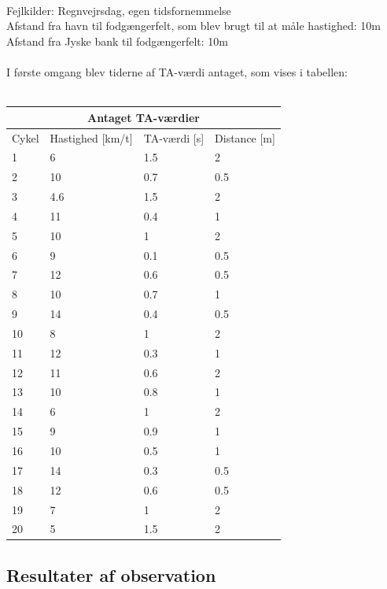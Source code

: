 \\
Fejlkilder: Regnvejrsdag, egen tidsfornemmelse
\\
Afstand fra havn til fodgængerfelt, som blev brugt til at måle hastighed: 10m
\\
Afstand fra Jyske bank til fodgængerfelt: 10m
\\\\
I første omgang blev tiderne af TA-værdi antaget, som vises i tabellen:
\\\\
\begin{tabular}{ |p{1cm}|p{4cm}|p{4cm}|p{4cm}|  }
\hline
\multicolumn{4}{|c|}{Antaget TA-værdier} \\
\hline
Cykel & Hastighed [km/t] & TA-værdi [s] & Distance [m] \\
\hline
1 & 6   & 1.5 & 2 \\
2 & 10  & 0.7 & 0.5 \\
3 & 4.6 & 1.5 & 2 \\
4 & 11  & 0.4 & 1 \\
5 & 10  & 1 & 2 \\
6 & 9   & 0.1 & 0.5 \\
7 & 12  & 0.6 & 0.5 \\
8 & 10  & 0.7 & 1 \\
9 & 14  & 0.4 & 0.5 \\
10 & 8  & 1   & 2 \\
11 & 12 &0.3  &  1 \\
12 & 11 & 0.6 &   2\\
13 & 10 & 0.8 & 1\\
14 & 6  & 1   & 2\\
15 & 9  & 0.9 & 1\\
16 & 10 & 0.5 & 1\\
17 & 14 & 0.3 &0.5\\
18 & 12 & 0.6 & 0.5\\
19 & 7  & 1 & 2\\
20 & 5  & 1.5 & 2\\
\hline
\end{tabular}




\subsection{Resultater af observation}
\label{sub:def_konflikt}

